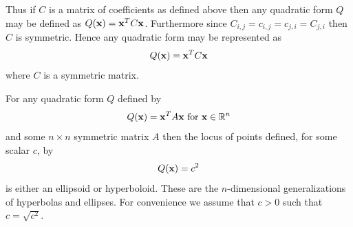 \documentclass{book}
\begin{document}
Thus if $C$ is a matrix of coefficients as defined above then any quadratic form $Q$ may be defined as $Q({\bf x})={\bf x}^TC{\bf x}$. Furthermore since $C_{i,j}=c_{i,j}=c_{j,i}=C_{j,i}$ then $C$ is symmetric. Hence any quadratic form may be represented as
$$
Q({\bf x})={\bf x}^TC{\bf x}
$$ 
where $C$ is a symmetric matrix. 


For any quadratic form $Q$ defined by 
$$
Q({\bf x})={\bf x}^TA{\bf x}\text{ for }{\bf x}\in\mathbb{R}^n
$$
and some $n \times n$ symmetric matrix $A$ then the locus of points defined, for some scalar $c$, by
$$
Q({\bf x})=c^2
$$
is either an ellipsoid or hyperboloid. These are the $n$-dimensional generalizations of hyperbolas and ellipses. For convenience we assume that $c>0$ such that $c=\sqrt{c^2}$.

\end{document}

